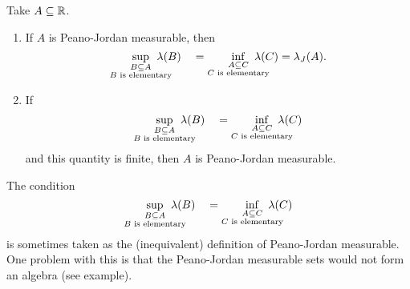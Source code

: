 \begin{proposition} \label{supInfPeanoJordanContent}
Take $A\subseteq \mathbb{R}$.
\begin{enumerate}
\item If $A$ is Peano-Jordan measurable, then
\[ \sup_{\substack{B\subseteq A \\ \text{$B$ is elementary}}} \hspace{-1.5em}\lambda(B) \quad = \inf_{\substack{A\subseteq C \\ \text{$C$ is elementary}}} \hspace{-1.5em}\lambda(C) = \lambda_J(A). \]
\item If
\[ \sup_{\substack{B\subseteq A \\ \text{$B$ is elementary}}} \hspace{-1.5em}\lambda(B) \quad = \inf_{\substack{A\subseteq C \\ \text{$C$ is elementary}}} \hspace{-1.5em}\lambda(C) \]
and this quantity is finite, then $A$ is Peano-Jordan measurable.
\end{enumerate}
\end{proposition}
The condition
\[ \sup_{\substack{B\subseteq A \\ \text{$B$ is elementary}}} \hspace{-1.5em}\lambda(B) \quad = \inf_{\substack{A\subseteq C \\ \text{$C$ is elementary}}} \hspace{-1.5em}\lambda(C) \]
is sometimes taken as the (inequivalent) definition of Peano-Jordan measurable. One problem with this is that the Peano-Jordan measurable sets would not form an algebra (see example).
